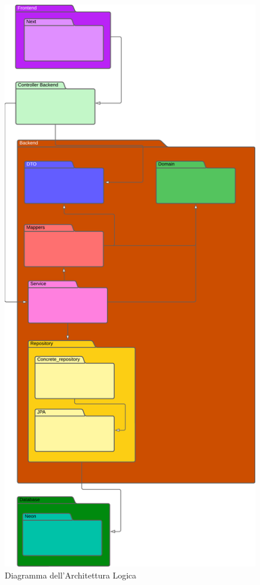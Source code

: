 \documentclass[12pt]{article}
\begin{document}
\begin{figure}[H]
    \includegraphics[width=\textwidth, height=\textheight,keepaspectratio]{Immagini/AL/Iterazione 1/ALArchitetturaLogica.png}
        \caption{Diagramma dell'Architettura Logica}
        \label{fig:diagrammaAL1}
\end{figure}
\end{document}
